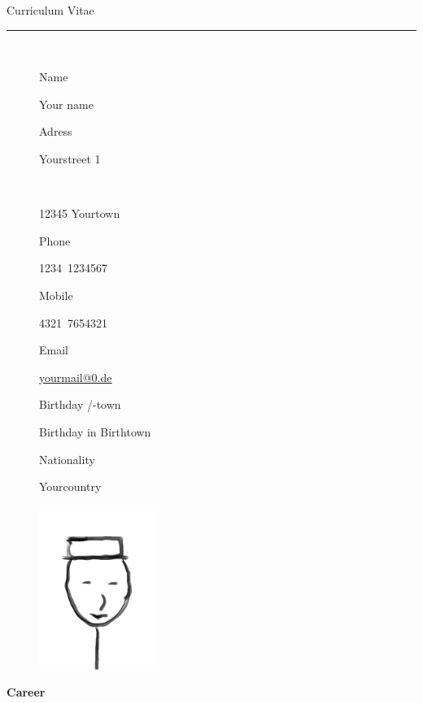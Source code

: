 \documentclass{scrartcl}
\date{}
\newcommand{\colorOne}{mycolor}
\newlength{\boxA}\settowidth{\boxA}{Geburtsdatum und ort}
\newlength{\boxB}\settowidth{\boxB}{So lange muss diese Zeile sein oder sogar länger, mal gucken noch}
\newcommand{\NewData}[2]{\noindent \parbox{\boxA}{#1}\hspace{1em}#2\vspace{0.5em}}
\newcommand{\NewEntry}[2]{\noindent \parbox[t]{\boxA}{#1}\hspace{1em}\parbox[t]{\boxB}{#2}}
\begin{document}
    \pagestyle{empty}
    \noindent \textcolor{\colorOne}{\Large Curriculum Vitae}\vspace{-0.27em}
    \\
    {\rule{\textwidth}{0.04em}
    \\ \vspace{-1.3em}
    \begin{figure}[htbp]
        \begin{minipage}{0.7\textwidth}
            \NewData{Name}{Your name}
            
            \NewData{Adress}{Yourstreet 1\\ \hspace{0.5em} \parbox{\boxA}{~}\hspace{1em}12345 Yourtown}
            
            \NewData{Phone}{1234~1234567}
            
            \NewData{Mobile}{4321~7654321}
            
            \NewData{Email}{\href{mailto:yourmail@0.de}{yourmail@0.de}}
            
            \NewData{Birthday /-town}{Birthday in Birthtown}
            
            
            \NewData{Nationality}{Yourcountry}
            
        \end{minipage}
        \hspace{2.2em}
        \begin{minipage}{0.2\textwidth}
            \centering
            \includegraphics[width=38mm]{photoA.jpg}
        \end{minipage}
    \end{figure}

\vspace{1em}

\NewEntry{\textcolor{\colorOne}{\textbf{Career}}}{~}

}
\end{document}
